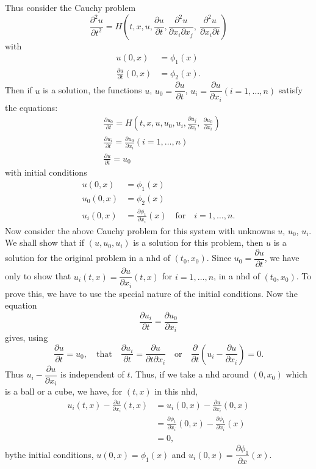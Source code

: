 Thus consider the Cauchy problem
$$
\frac{\partial^{2}u}{\partial t^{2}}=H\left(t,x,u,\frac{\partial u}{\partial t}, \frac{\partial^{2}u}{\partial x_{i}\partial x_{j}}, \ \frac{\partial^{2}u}{\partial x_{i}\partial t}\right)
$$
with
\begin{align*}
u(0,x) &= \phi_{1}(x)\\[3pt]
\frac{\partial u}{\partial t}(0,x) &= \phi_{2}(x).
\end{align*}
Then if $u$ is a solution, the functions $u$, $u_{0}=\dfrac{\partial u}{\partial t}$, $u_{i}=\dfrac{\partial u}{\partial x_{i}}(i=1,\ldots,n)$ satisfy the equations:
\begin{align*}
& \frac{\partial u_{0}}{\partial t} =H\left(t,x,u,u_{0},u_{i},\frac{\partial u_{j}}{\partial x_{i}}, \ \frac{\partial u_{0}}{\partial x_{i}}\right)\\[3pt]
& \frac{\partial u_{i}}{\partial t}=\frac{\partial u_{0}}{\partial x_{i}}(i=1,\ldots,n)\\[3pt]
& \frac{\partial u}{\partial t}=u_{0}
\end{align*}\pageoriginale
with initial conditions
\begin{align*}
u(0,x) &= \phi_{1}(x)\\[3pt]
u_{0}(0,x) &= \phi_{2}(x)\\[3pt]
u_{i}(0,x) &= \frac{\partial \phi_{1}}{\partial x_{i}}(x)\quad\text{for}\quad i=1,\ldots,n.
\end{align*}
Now consider the above Cauchy problem for this system with unknowns $u$, $u_{0}$, $u_{i}$. We shall show that if $(u,u_{0},u_{i})$ is a solution for this problem, then $u$ is a solution for the original problem in a nhd of $(t_{0},x_{0})$. Since $u_{0}=\dfrac{\partial u}{\partial t}$, we have only to show that $u_{i}(t,x)=\dfrac{\partial u}{\partial x_{i}}(t,x)$ for $i=1,\ldots,n$, in a nhd of $(t_{0},x_{0})$. To prove this, we have to use the special nature of the initial conditions. Now the equation
$$
\frac{\partial u_{i}}{\partial t}=\frac{\partial u_{0}}{\partial x_{i}}
$$
gives, using
$$
\frac{\partial u}{\partial t}=u_{0},\quad\text{that}\quad \frac{\partial u_{i}}{\partial t}=\frac{\partial u}{\partial t\partial x_{i}}\quad\text{or}\quad \frac{\partial}{\partial t}\left(u_{i}-\frac{\partial u}{\partial x_{i}}\right)=0.
$$
Thus $u_{i}-\dfrac{\partial u}{\partial x_{i}}$ is independent of $t$. Thus, if we take a nhd around $(0,x_{0})$ which is a ball or a cube, we have, for $(t,x)$ in this nhd,
\begin{align*}
u_{i}(t,x) - \frac{\partial u}{\partial x_{i}}(t,x) &= u_{i}(0,x)-\frac{\partial u}{\partial x_{i}}(0,x)\\[3pt]
&= \frac{\partial \phi_{1}}{\partial x_{i}}(0,x)-\frac{\partial \phi_{1}}{\partial x_{i}}(x)\\[3pt]
&= 0,
\end{align*}
by\pageoriginale the initial conditions, $u(0,x)=\phi_{1}(x)$ and $u_{i}(0,x)=\dfrac{\partial \phi_{1}}{\partial x}(x)$.

